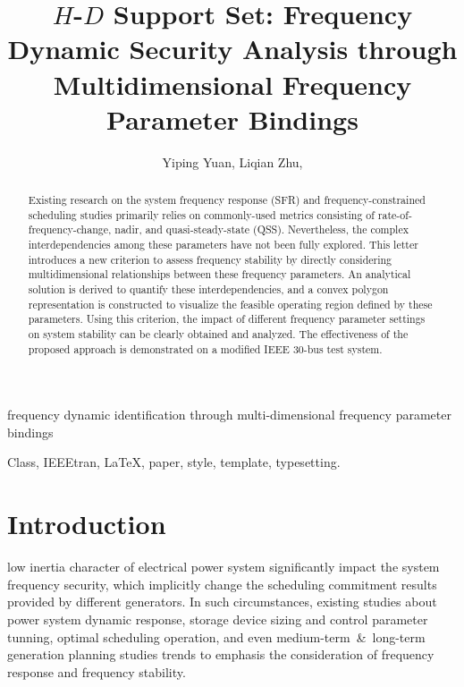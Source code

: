 \documentclass[lettersize,journal]{IEEEtran}
\begin{document}


\title{$H$-$D$ Support Set: Frequency Dynamic Security Analysis through Multidimensional Frequency Parameter Bindings}
\author{Yiping Yuan, Liqian Zhu,
}

%
{frequency dynamic identification through multi-dimensional frequency parameter bindings}

\maketitle

\begin{abstract}

  Existing research on the system frequency response (SFR) and frequency-constrained scheduling studies primarily relies on commonly-used metrics consisting of rate-of-frequency-change, nadir, and quasi-steady-state (QSS). Nevertheless, the complex interdependencies among these parameters have not been fully explored. This letter introduces a new criterion to assess frequency stability by directly considering multidimensional relationships between these frequency parameters. An analytical solution is derived to quantify these interdependencies, and a convex polygon representation is constructed to visualize the feasible operating region defined by these parameters. Using this criterion, the impact of different frequency parameter settings on system stability can be clearly obtained and analyzed. The effectiveness of the proposed approach is demonstrated on a modified IEEE 30-bus test system.

\end{abstract}

\begin{IEEEkeywords}
Class, IEEEtran, \LaTeX, paper, style, template, typesetting.
\end{IEEEkeywords}

\section{Introduction}
 low inertia character of electrical power system significantly impact the system frequency security, which implicitly change the scheduling commitment results provided by different generators. In such circumstances, existing studies about power system dynamic response, storage device sizing and control parameter tunning, optimal scheduling operation, and even medium-term~\&~long-term generation planning studies trends to emphasis the consideration of frequency response and frequency stability.
\end{document}
